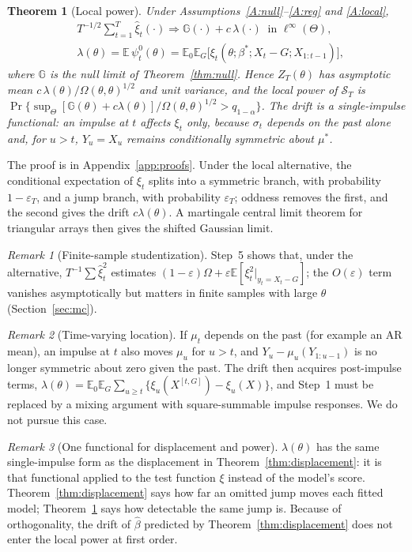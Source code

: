\documentclass[11pt,a4paper]{article}
\newtheorem{theorem}{Theorem}
\theoremstyle{definition}
\theoremstyle{remark}
\newtheorem{remark}{Remark}
\newcommand{\E}{\mathbb{E}}
\begin{document}
\begin{theorem}[Local power]\label{thm:local}
Under Assumptions~\ref{A:null}--\ref{A:reg} and \ref{A:local},
\[
\begin{aligned}
&T^{-1/2}\sum_{t=1}^T\hat\xi_t(\cdot)\Rightarrow\mathbb G(\cdot)+c\,\lambda(\cdot)\ \text{ in }\ell^\infty(\Theta),\\
&\lambda(\theta)=\E\,\psi^0_t(\theta)=\E_0\E_G\big[\xi_t(\theta;\beta^*;X_t-G;X_{1:t-1})\big],
\end{aligned}
\]
where $\mathbb G$ is the null limit of Theorem~\ref{thm:null}. Hence $Z_T(\theta)$ has asymptotic mean $c\,\lambda(\theta)/\Omega(\theta,\theta)^{1/2}$ and unit variance, and the local power of $\mathcal S_T$ is $\Pr\{\sup_\Theta[\mathbb G(\theta)+c\lambda(\theta)]/\Omega(\theta,\theta)^{1/2}>q_{1-\alpha}\}$. The drift is a single-impulse functional: an impulse at $t$ affects $\xi_t$ only, because $\sigma_t$ depends on the past alone and, for $u>t$, $Y_u=X_u$ remains conditionally symmetric about $\mu^*$.
\end{theorem}
\noindent The proof is in Appendix~\ref{app:proofs}. Under the local alternative, the conditional expectation of $\xi_t$ splits into a symmetric branch, with probability $1-\varepsilon_T$, and a jump branch, with probability $\varepsilon_T$; oddness removes the first, and the second gives the drift $c\lambda(\theta)$. A martingale central limit theorem for triangular arrays then gives the shifted Gaussian limit.

\begin{remark}[Finite-sample studentization]
Step~5 shows that, under the alternative, $T^{-1}\sum\hat\xi_t^2$ estimates $(1-\varepsilon)\Omega+\varepsilon\E[\xi_t^2|_{y_t=X_t-G}]$; the $O(\varepsilon)$ term vanishes asymptotically but matters in finite samples with large $\theta$ (Section~\ref{sec:mc}).
\end{remark}

\begin{remark}[Time-varying location]
If $\mu_t$ depends on the past (for example an AR mean), an impulse at $t$ also moves $\mu_u$ for $u>t$, and $Y_u-\mu_u(Y_{1:u-1})$ is no longer symmetric about zero given the past. The drift then acquires post-impulse terms, $\lambda(\theta)=\E_0\E_G\sum_{u\ge t}\{\xi_u(X^{[t,G]})-\xi_u(X)\}$, and Step~1 must be replaced by a mixing argument with square-summable impulse responses. We do not pursue this case.
\end{remark}

\begin{remark}[One functional for displacement and power]\label{rem:onefunctional}
$\lambda(\theta)$ has the same single-impulse form as the displacement in Theorem~\ref{thm:displacement}: it is that functional applied to the test function $\xi$ instead of the model's score. Theorem~\ref{thm:displacement} says how far an omitted jump moves each fitted model; Theorem~\ref{thm:local} says how detectable the same jump is. Because of orthogonality, the drift of $\hat\beta$ predicted by Theorem~\ref{thm:displacement} does not enter the local power at first order.
\end{remark}
\end{document}
